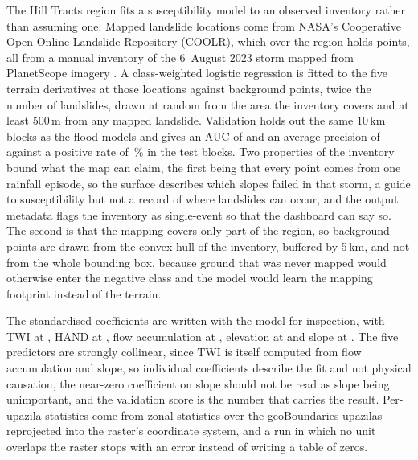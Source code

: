 The Hill Tracts region fits a susceptibility model to an observed inventory rather than assuming one. Mapped landslide locations come from NASA's Cooperative Open Online Landslide Repository (COOLR), which over the region holds \CHTLandslides{} points, all from a manual inventory of the 6~August 2023 storm mapped from PlanetScope imagery \citep{juang2019}. A class-weighted logistic regression is fitted to the five terrain derivatives at those locations against \CHTBackground{} background points, twice the number of landslides, drawn at random from the area the inventory covers and at least 500\,m from any mapped landslide. Validation holds out the same 10\,km blocks as the flood models and gives an AUC of \CHTLSAUC{} and an average precision of \CHTLSAP{} against a positive rate of \CHTLSPositiveRate{}\,\% in the test blocks. Two properties of the inventory bound what the map can claim, the first being that every point comes from one rainfall episode, so the surface describes which slopes failed in that storm, a guide to susceptibility but not a record of where landslides can occur, and the output metadata flags the inventory as single-event so that the dashboard can say so. The second is that the mapping covers only part of the region, so background points are drawn from the convex hull of the inventory, buffered by 5\,km, and not from the whole bounding box, because ground that was never mapped would otherwise enter the negative class and the model would learn the mapping footprint instead of the terrain.

The standardised coefficients are written with the model for inspection, with TWI at \CHTCoefTwi{}, HAND at \CHTCoefHand{}, flow accumulation at \CHTCoefFlowAcc{}, elevation at \CHTCoefElevation{} and slope at \CHTCoefSlope{}. The five predictors are strongly collinear, since TWI is itself computed from flow accumulation and slope, so individual coefficients describe the fit and not physical causation, the near-zero coefficient on slope should not be read as slope being unimportant, and the validation score is the number that carries the result. Per-upazila statistics come from zonal statistics over the geoBoundaries upazilas reprojected into the raster's coordinate system, and a run in which no unit overlaps the raster stops with an error instead of writing a table of zeros.


